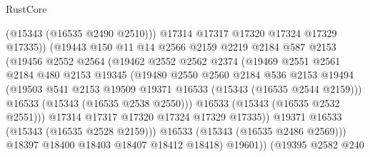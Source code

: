 \begin{lexlean}{RustCore}
\begin{coremodule}
                              (@15343 (@16535 @2490 @2510)))
                            @17314
                            @17317
                            @17320
                            @17324
                            @17329
                            @17335))
                        (@19443
                          @150
                          @11
                          @14
                          @2566
                          @2159
                          @2219
                          @2184
                          @587
                          @2153
                          (@19456
                            @2552
                            @2564
                            (@19462
                              @2552
                              @2562
                              @2374
                              (@19469
                                @2551
                                @2561
                                @2184
                                @480
                                @2153
                                @19345
                                (@19480
                                  @2550
                                  @2560
                                  @2184
                                  @536
                                  @2153
                                  @19494
                                  (@19503
                                    @541
                                    @2153
                                    @19509
                                    @19371
                                    @16533
                                    (@15343 (@16535 @2544 @2159)))
                                  @16533
                                  (@15343 (@16535 @2538 @2550)))
                                @16533
                                (@15343 (@16535 @2532 @2551)))
                              @17314
                              @17317
                              @17320
                              @17324
                              @17329
                              @17335))
                          @19371
                          @16533
                          (@15343 (@16535 @2528 @2159)))
                        @16533
                        (@15343 (@16535 @2486 @2569)))
                      @18397
                      @18400
                      @18403
                      @18407
                      @18412
                      @18418)
                    @19601))
                (@19395
                  @2582
                  @240

\end{coremodule}
\end{lexlean}
